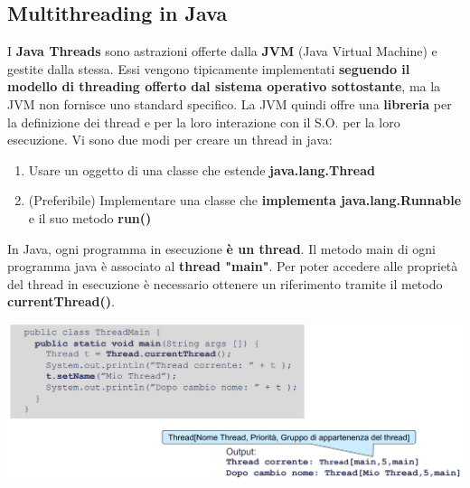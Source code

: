 \documentclass[12pt]{article}
\begin{document}
\subsection{Multithreading in Java}
I \textbf{Java Threads} sono astrazioni offerte dalla \textbf{JVM} (Java Virtual Machine) e gestite dalla stessa. Essi vengono tipicamente implementati \textbf{seguendo il modello di threading offerto dal sistema operativo sottostante}, ma la JVM non fornisce uno standard specifico. La JVM quindi offre una \textbf{libreria} per la definizione dei thread e per la loro interazione con il S.O. per la loro esecuzione. Vi sono due modi per creare un thread in java:
\begin{enumerate}
    \item Usare un oggetto di una classe che estende \textbf{java.lang.Thread}
    \item (Preferibile) Implementare una classe che \textbf{implementa java.lang.Runnable} e il suo metodo \textbf{run()}
\end{enumerate}
In Java, ogni programma in esecuzione \textbf{è un thread}. Il metodo main di ogni programma java è associato al \textbf{thread "main"}. Per poter accedere alle proprietà del thread in esecuzione è necessario ottenere un riferimento tramite il metodo \newline \textbf{currentThread()}.
\begin{center}
    \includegraphics[width = 1.10\textwidth]{Images/67.PNG}
\end{center}
\end{document}
